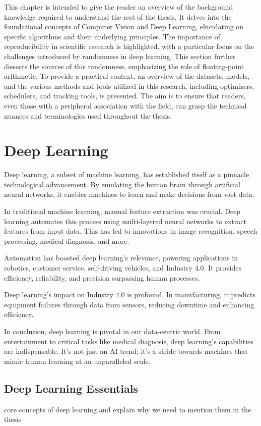 This chapter is intended to give the reader an overview of the background knowledge required to understand the rest of the thesis. 
It delves into the foundational concepts of Computer Vision and Deep Learning, elucidating on specific algorithms
and their underlying principles. The importance of reproducibility in scientific research is highlighted, with a particular focus 
on the challenges introduced by randomness in deep learning. This section further dissects the sources of this randomness, 
emphasizing the role of floating-point arithmetic. To provide a practical context, an overview of the datasets, models, and 
the various methods and tools utilized in this research, including optimizers, schedulers, and tracking tools, is presented. 
The aim is to ensure that readers, even those with a peripheral association with the field, can grasp the technical nuances and 
terminologies used throughout the thesis.
\section{Deep Learning}

Deep learning, a subset of machine learning, has established itself as a pinnacle technological advancement. By emulating the human brain through artificial neural networks, it enables machines to learn and make decisions from vast data.

In traditional machine learning, manual feature extraction was crucial. Deep learning automates this process using multi-layered neural networks to extract features from input data. This has led to innovations in image recognition, speech processing, medical diagnosis, and more.

Automation has boosted deep learning's relevance, powering applications in robotics, customer service, self-driving vehicles, and Industry 4.0. It provides efficiency, reliability, and precision surpassing human processes.

Deep learning's impact on Industry 4.0 is profound. In manufacturing, it predicts equipment failures through data from sensors, reducing downtime and enhancing efficiency.

In conclusion, deep learning is pivotal in our data-centric world. From entertainment to critical tasks like medical diagnosis, deep learning's capabilities are indispensable. It's not just an AI trend; it's a stride towards machines that mimic human learning at an unparalleled scale.

\subsection{Deep Learning Essentials}
core concepts of deep learning and explain why we need to mention them in the thesis
